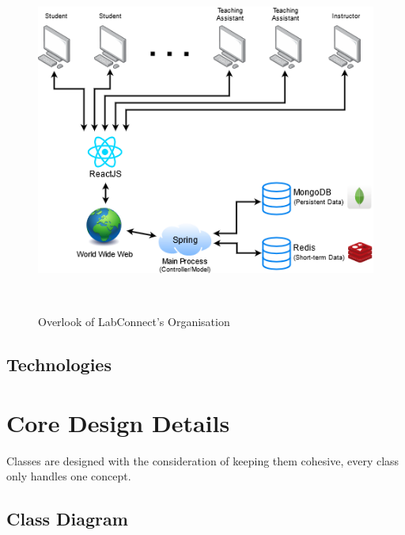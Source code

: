 \documentclass[a4paper, 12pt]{article}
\begin{document}
    \begin{figure}[H]
        \centering
        \includegraphics[width=\textwidth]{tech-diagram}
        \caption{Overlook of LabConnect's Organisation}~\label{fig:organisation-diagram}
    \end{figure}
    
    \subsection{Technologies}
    

    \pagebreak

    \section{Core Design Details}
    
    Classes are designed with the consideration of keeping them cohesive, every class only handles one concept. 


    \subsection{Class Diagram}
    
\end{document}
